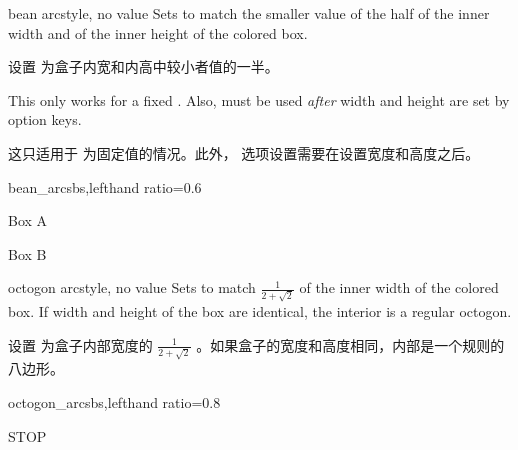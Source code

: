   
  \begin{docTcbKey}[][doc new=2015-05-05]{bean arc}{}{style, no value}
  Sets  to match the smaller value of the
  half of the inner width and of the inner height of the colored box.
  
  设置  为盒子内宽和内高中较小者值的一半。
  
  \begin{marker}
  This only works for a fixed . Also, 
  must be used \emph{after} width and height are set by option keys.
  
  这只适用于  为固定值的情况。此外， 选项设置需要在设置宽度和高度之后。
  \end{marker}
  \begin{exdispExample*}{bean_arc}{sbs,lefthand ratio=0.6}
  
  \begin{tcolorbox}[width=3cm,height=2cm,
  bean arc]
  Box A
  \end{tcolorbox}
  
  \begin{tcolorbox}[width=2cm,height=3cm,
  bean arc]
  Box B
  \end{tcolorbox}
  \end{exdispExample*}
  \end{docTcbKey}
  
  \begin{docTcbKey}[][doc new=2015-05-05]{octogon arc}{}{style, no value}
  Sets  to match $\frac{1}{2+\sqrt{2}}$ of the inner width
  of the colored box. If width and height of the box are identical,
  the interior is a regular octogon.
  
  设置  为盒子内部宽度的 $\frac{1}{2+\sqrt{2}}$ 。如果盒子的宽度和高度相同，内部是一个规则的八边形。
  \begin{exdispExample*}{octogon_arc}{sbs,lefthand ratio=0.8}
  \begin{tcolorbox}[enhanced,
  size=minimal,auto outer arc,
  width=2.1cm,octogon arc,
  colback=red,colframe=white,colupper=white,
  fontupper=\fontsize{7mm}{7mm}\selectfont\bfseries\sffamily,
  halign=center,valign=center,
  square,arc is angular,
  borderline={0.2mm}{-1mm}{red}  ]
  STOP
  \end{tcolorbox}
  \end{exdispExample*}
  \end{docTcbKey}

